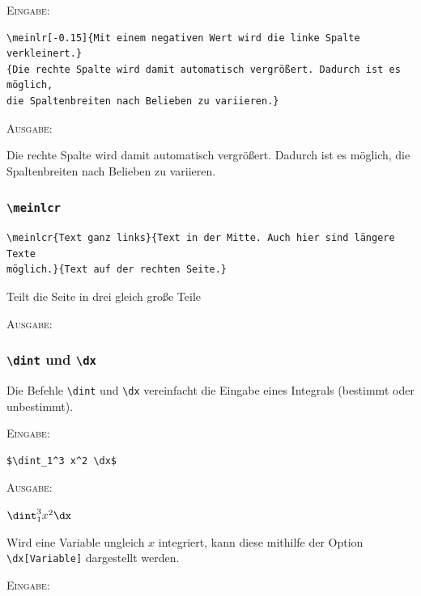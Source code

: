 \documentclass[a4paper,12pt]{article}
\begin{document}
\textsc{Eingabe:}

\begin{verbatim}
\meinlr[-0.15]{Mit einem negativen Wert wird die linke Spalte verkleinert.}
{Die rechte Spalte wird damit automatisch vergrößert. Dadurch ist es möglich, 
die Spaltenbreiten nach Belieben zu variieren.}
\end{verbatim}

\textsc{Ausgabe:}

{Die rechte Spalte wird damit automatisch vergrößert. Dadurch ist es möglich, 
die Spaltenbreiten nach Belieben zu variieren.}

\leer

\subsubsection{\texttt{\textbackslash meinlcr}}
\begin{verbatim}
\meinlcr{Text ganz links}{Text in der Mitte. Auch hier sind längere Texte
möglich.}{Text auf der rechten Seite.}
\end{verbatim}
Teilt die Seite in drei gleich große Teile

\leer

\textsc{Ausgabe:}



\subsubsection{\texttt{\textbackslash dint} und \texttt{\textbackslash dx}}
Die Befehle \texttt{\textbackslash dint} und \texttt{\textbackslash dx} vereinfacht die Eingabe eines Integrals (bestimmt oder unbestimmt).\leer

\textsc{Eingabe:}

\begin{verbatim}
$\dint_1^3 x^2 \dx$ 
\end{verbatim}

\textsc{Ausgabe:}\leer

$\dint_1^3 x^2 \dx$ 
\leer

Wird eine Variable ungleich $x$ integriert, kann diese mithilfe der Option \texttt{\textbackslash{dx[Variable]}} dargestellt werden.\leer

\textsc{Eingabe:}
\end{document}
